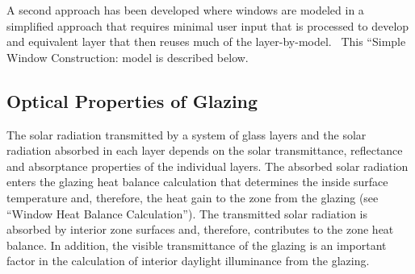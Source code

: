 A second approach has been developed where windows are modeled in a simplified approach that requires minimal user input that is processed to develop and equivalent layer that then reuses much of the layer-by-model.~ This ``Simple Window Construction: model is described below.

\subsection{Optical Properties of Glazing}\label{optical-properties-of-glazing}

The solar radiation transmitted by a system of glass layers and the solar radiation absorbed in each layer depends on the solar transmittance, reflectance and absorptance properties of the individual layers. The absorbed solar radiation enters the glazing heat balance calculation that determines the inside surface temperature and, therefore, the heat gain to the zone from the glazing (see ``Window Heat Balance Calculation''). The transmitted solar radiation is absorbed by interior zone surfaces and, therefore, contributes to the zone heat balance. In addition, the visible transmittance of the glazing is an important factor in the calculation of interior daylight illuminance from the glazing.

